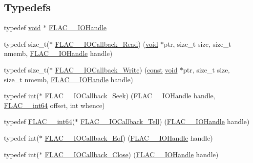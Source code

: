 \subsection*{Typedefs}
\begin{DoxyCompactItemize}
\item 
typedef \hyperlink{png_8h_ac9c84fa68bbad002983e35ce3663c686}{void} $\ast$ \hyperlink{group__flac__callbacks_ga4c329c3168dee6e352384c5e9306260d}{F\+L\+A\+C\+\_\+\+\_\+\+I\+O\+Handle}
\item 
typedef size\+\_\+t($\ast$ \hyperlink{group__flac__callbacks_ga49d95218a6c09b215cd92cc96de71bf9}{F\+L\+A\+C\+\_\+\+\_\+\+I\+O\+Callback\+\_\+\+Read}) (\hyperlink{png_8h_ac9c84fa68bbad002983e35ce3663c686}{void} $\ast$ptr, size\+\_\+t size, size\+\_\+t nmemb, \hyperlink{group__flac__callbacks_ga4c329c3168dee6e352384c5e9306260d}{F\+L\+A\+C\+\_\+\+\_\+\+I\+O\+Handle} handle)
\item 
typedef size\+\_\+t($\ast$ \hyperlink{group__flac__callbacks_gad991792235879aecae289b56a112e1b8}{F\+L\+A\+C\+\_\+\+\_\+\+I\+O\+Callback\+\_\+\+Write}) (\hyperlink{zconf_8h_a2c212835823e3c54a8ab6d95c652660e}{const} \hyperlink{png_8h_ac9c84fa68bbad002983e35ce3663c686}{void} $\ast$ptr, size\+\_\+t size, size\+\_\+t nmemb, \hyperlink{group__flac__callbacks_ga4c329c3168dee6e352384c5e9306260d}{F\+L\+A\+C\+\_\+\+\_\+\+I\+O\+Handle} handle)
\item 
typedef int($\ast$ \hyperlink{group__flac__callbacks_gab3942bbbd6ae09bcefe7cb3a0060c49c}{F\+L\+A\+C\+\_\+\+\_\+\+I\+O\+Callback\+\_\+\+Seek}) (\hyperlink{group__flac__callbacks_ga4c329c3168dee6e352384c5e9306260d}{F\+L\+A\+C\+\_\+\+\_\+\+I\+O\+Handle} handle, \hyperlink{ordinals_8h_a12b57f75f760b9062a13bcda1bdb3f3e}{F\+L\+A\+C\+\_\+\+\_\+int64} offset, int whence)
\item 
typedef \hyperlink{ordinals_8h_a12b57f75f760b9062a13bcda1bdb3f3e}{F\+L\+A\+C\+\_\+\+\_\+int64}($\ast$ \hyperlink{group__flac__callbacks_ga45314930cabc2e9c04867eae6bca309f}{F\+L\+A\+C\+\_\+\+\_\+\+I\+O\+Callback\+\_\+\+Tell}) (\hyperlink{group__flac__callbacks_ga4c329c3168dee6e352384c5e9306260d}{F\+L\+A\+C\+\_\+\+\_\+\+I\+O\+Handle} handle)
\item 
typedef int($\ast$ \hyperlink{group__flac__callbacks_ga00ae3b3d373e691908e9539ebf720675}{F\+L\+A\+C\+\_\+\+\_\+\+I\+O\+Callback\+\_\+\+Eof}) (\hyperlink{group__flac__callbacks_ga4c329c3168dee6e352384c5e9306260d}{F\+L\+A\+C\+\_\+\+\_\+\+I\+O\+Handle} handle)
\item 
typedef int($\ast$ \hyperlink{group__flac__callbacks_ga0032267fac38220689778833e08f7387}{F\+L\+A\+C\+\_\+\+\_\+\+I\+O\+Callback\+\_\+\+Close}) (\hyperlink{group__flac__callbacks_ga4c329c3168dee6e352384c5e9306260d}{F\+L\+A\+C\+\_\+\+\_\+\+I\+O\+Handle} handle)
\end{DoxyCompactItemize}



